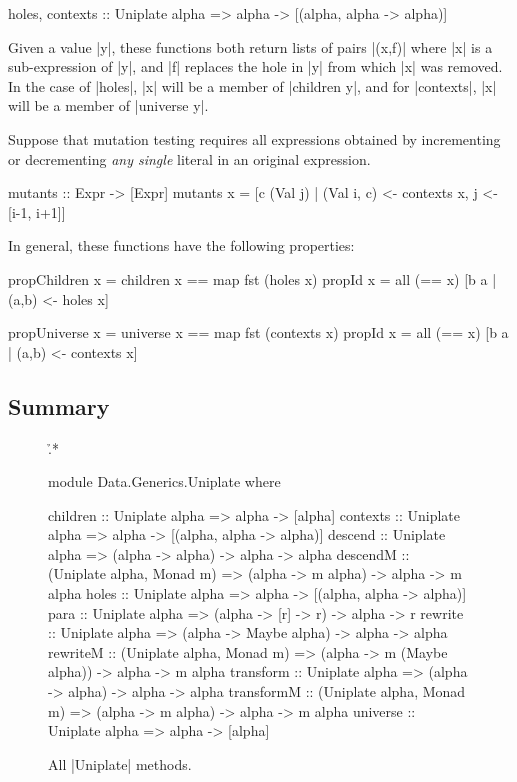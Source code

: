 \begin{code}
holes, contexts :: Uniplate alpha => alpha -> [(alpha, alpha -> alpha)]
\end{code}

Given a value |y|, these functions both return lists of pairs |(x,f)| where |x| is a sub-expression of |y|, and |f| replaces the hole in |y| from which |x| was removed. In the case of |holes|, |x| will be a member of |children y|, and for |contexts|, |x| will be a member of |universe y|.

\begin{example}
Suppose that mutation testing requires all expressions obtained by incrementing or decrementing \textit{any single} literal in an original expression.

\begin{code}
mutants :: Expr -> [Expr]
mutants x =  [c (Val j) | (Val i, c) <- contexts x,  j <- [i-1, i+1]]
\end{code}
\end{example}

In general, these functions have the following properties:

\begin{code}
propChildren  x = children x == map fst (holes    x)
propId        x = all (== x) [b a | (a,b) <- holes     x]
\end{code}
\begin{code}
propUniverse  x = universe x == map fst (contexts x)
propId        x = all (== x) [b a | (a,b) <- contexts  x]
\end{code}


\subsection{Summary}

\begin{figure}
\h{.*}\begin{code}
module Data.Generics.Uniplate where

children    :: Uniplate alpha => alpha -> [alpha]
contexts    :: Uniplate alpha => alpha -> [(alpha, alpha -> alpha)]
descend     :: Uniplate alpha => (alpha -> alpha) -> alpha -> alpha
descendM    :: (Uniplate alpha, Monad m) => (alpha -> m alpha) -> alpha -> m alpha
holes       :: Uniplate alpha => alpha -> [(alpha, alpha -> alpha)]
para        :: Uniplate alpha => (alpha -> [r] -> r) -> alpha -> r
rewrite     :: Uniplate alpha => (alpha -> Maybe alpha) -> alpha -> alpha
rewriteM    :: (Uniplate alpha, Monad m)  => (alpha -> m (Maybe alpha)) -> alpha -> m alpha
transform   :: Uniplate alpha => (alpha -> alpha) -> alpha -> alpha
transformM  :: (Uniplate alpha, Monad m) => (alpha -> m alpha) -> alpha -> m alpha
universe    :: Uniplate alpha => alpha -> [alpha]
\end{code}
\caption{All |Uniplate| methods.}
\label{figU:play}
\end{figure}

